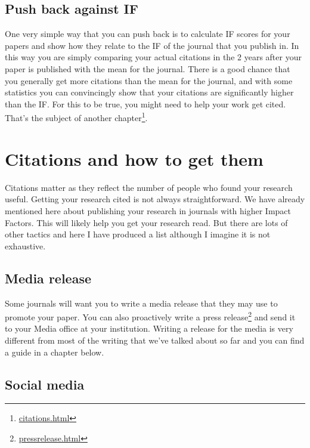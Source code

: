 \documentclass[
]{krantz}
\renewcommand{\href}[2]{#2\footnote{\url{#1}}}
\begin{document}
\hypertarget{push-back-against-if}{%
\section{Push back against IF}\label{push-back-against-if}}

One very simple way that you can push back is to calculate IF scores for your papers and show how they relate to the IF of the journal that you publish in. In this way you are simply comparing your actual citations in the 2 years after your paper is published with the mean for the journal. There is a good chance that you generally get more citations than the mean for the journal, and with some statistics you can convincingly show that your citations are significantly higher than the IF. For this to be true, you might need to help your work get cited. \href{citations.html}{That's the subject of another chapter}.

\hypertarget{citations}{%
\chapter{Citations and how to get them}\label{citations}}

Citations matter as they reflect the number of people who found your research useful. Getting your research cited is not always straightforward. We have already mentioned here about publishing your research in journals with higher Impact Factors. This will likely help you get your research read. But there are lots of other tactics and here I have produced a list although I imagine it is not exhaustive.

\hypertarget{media-release}{%
\section{Media release}\label{media-release}}

Some journals will want you to write a media release that they may use to promote your paper. You can also proactively \href{pressrelease.html}{write a press release} and send it to your Media office at your institution. Writing a release for the media is very different from most of the writing that we've talked about so far and you can find a guide in a chapter below.

\hypertarget{social-media}{%
\section{Social media}\label{social-media}}
\end{document}
